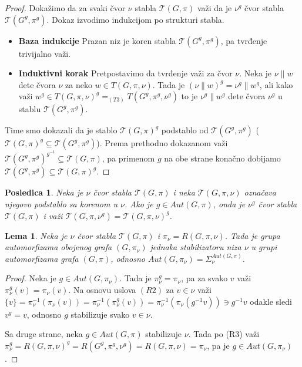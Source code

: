 \documentclass[12pt,oneside]{memoir}
\newtheorem{lemma}{Lema}
\newtheorem{corrolary}{Posledica}
\theoremstyle{definition}
\begin{document}
  \begin{proof}
      Dokažimo da za svaki čvor $\nu$ stabla $\mathcal{T}(G, \pi)$ važi da je
      $\nu^g$ čvor stabla $\mathcal{T}(G^g, \pi^g)$. Dokaz izvodimo indukcijom
      po strukturi stabla.
      \begin{itemize}
     	 \item[] \textbf{Baza indukcije} Prazan niz je koren stabla
     		 $\mathcal{T}(G^g, \pi^g)$, pa tvrđenje trivijalno važi.
     	 \item[] \textbf{Induktivni korak} Pretpostavimo da tvrđenje važi za
     		 čvor $\nu$. Neka je $\nu \| w$ dete čvora $\nu$ za neko $w \in
     		 T(G, \pi, \nu)$. Tada je $(\nu \| w)^g = \nu^g \| w^g$, ali kako
     		 važi $w^g \in T(G, \pi, \nu)^g =_{(T3)} T(G^g, \pi^g, \nu^g)$
     		 to je $\nu^g \| w^g$ dete čvora $\nu^g$ u stablu $\mathcal{T}(G^g,
     		 \pi^g)$.
      \end{itemize}
      Time smo dokazali da je stablo $\mathcal{T}(G, \pi)^g$ podstablo od
      $\mathcal{T}(G^g, \pi^g)$ ($\mathcal{T}(G, \pi)^g \subseteq
      \mathcal{T}(G^g, \pi^g)$). Prema prethodno dokazanom važi
      $\mathcal{T}(G^g, \pi^g)^{g^{-1}} \subseteq \mathcal{T}(G, \pi)$, pa
      primenom $g$ na obe strane konačno dobijamo $\mathcal{T}(G^g, \pi^g)
      \subseteq \mathcal{T}(G, \pi)^g$.
  \end{proof}

  \begin{corrolary}
	  \label{corr:auttree}
      Neka je $\nu$ čvor stabla $\mathcal{T}(G, \pi)$ i neka $\mathcal{T}(G,
      \pi, \nu)$ označava njegovo podstablo sa korenom u $\nu$. Ako je $g
      \in Aut(G, \pi)$, onda je $\nu^g$ čvor stabla $\mathcal{T}(G, \pi)$ i
      važi $\mathcal{T}(G, \pi, \nu^g) = \mathcal{T}(G, \pi, \nu)^g$.
  \end{corrolary}

  \begin{lemma}
	  Neka je $\nu$ čvor stabla $\mathcal{T}(G, \pi)$ i $\pi_\nu = R(G, \pi,
	  \nu)$. Tada je grupa automorfizama obojenog grafa $(G, \pi_\nu)$ jednaka
	  stabilizatoru niza $\nu$ u grupi automorfizama grafa $(G, \pi)$, odnosno
	  $Aut(G, \pi_\nu) = \Sigma_\nu^{Aut(G, \pi)}$.
  \end{lemma}

  \begin{proof}
	  Neka je $g \in Aut(G, \pi_\nu)$. Tada je $\pi_\nu^g = \pi_\nu$, pa za
	  svako $v$ važi $\pi_\nu^g(v) = \pi_\nu(v)$. Na osnovu uslova $(R2)$ za $v
	  \in \nu$ važi $\{v\} = \pi_\nu^{-1}(\pi_\nu(v)) =
	  \pi_\nu^{-1}(\pi_\nu^g(v)) = \pi_\nu^{-1}(\pi_\nu(g^{-1}v)) \ni g^{-1}v$
	  odakle sledi $v^g = v$, odnosno $g$ stabilizuje svako $v \in \nu$.

	  Sa druge strane, neka $g \in Aut(G, \pi)$ stabilizuje $\nu$. Tada po (R3)
	  važi $\pi_\nu^g = R(G, \pi, \nu)^g = R(G^g, \pi^g, \nu^g) = R(G, \pi,
	  \nu) = \pi_\nu$, pa je $g \in Aut(G, \pi_\nu)$.
  \end{proof}
\end{document}
